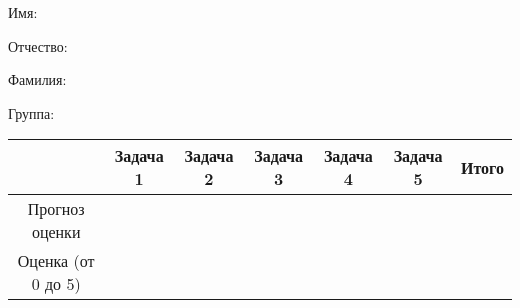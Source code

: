 \documentclass[pdftex,12pt,a4paper]{article}
\begin{document}
\begin{large}
Имя:
\end{large}

\vspace{4pt}

\begin{large}
Отчество:
\end{large}

\vspace{4pt}

\begin{large}
Фамилия:
\end{large}

\vspace{4pt}

\begin{large}
Группа:
\end{large}

\vspace{4pt} 

\begin{tabular}{|c|c|c|c|c|c|c|}
\hline  & Задача 1 & Задача 2 & Задача 3 & Задача 4 & Задача 5 & Итого \\ 
\hline Прогноз оценки &  &  &  &  &  & \\ 
\hline Оценка (от 0 до 5) &  &  &  &  &  & \\ 
\hline 
\end{tabular} 
\newpage
\end{document}
